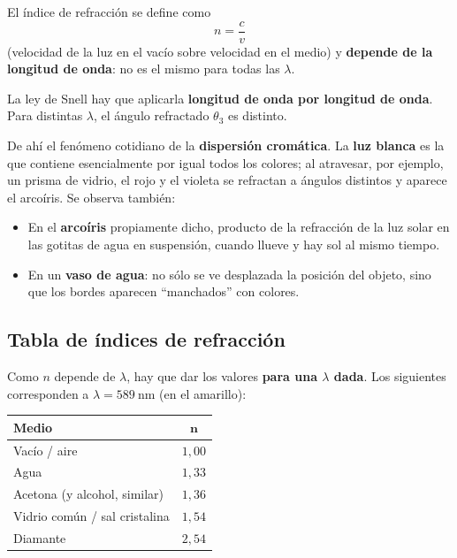 \documentclass[12pt,a4paper]{article}
\begin{document}
El índice de refracción se define como
\[
n = \frac{c}{v}
\]
(velocidad de la luz en el vacío sobre velocidad en el medio) y \textbf{depende
de la longitud de onda}: no es el mismo para todas las $\lambda$.

\begin{warnbox}[Consecuencia]
La ley de Snell hay que aplicarla \textbf{longitud de onda por longitud de
onda}. Para distintas $\lambda$, el ángulo refractado $\theta_3$ es distinto.
\end{warnbox}

De ahí el fenómeno cotidiano de la \textbf{dispersión cromática}. La \textbf{luz
blanca} es la que contiene esencialmente por igual todos los colores; al
atravesar, por ejemplo, un prisma de vidrio, el rojo y el violeta se refractan a
ángulos distintos y aparece el arcoíris. Se observa también:

\begin{itemize}
  \item En el \textbf{arcoíris} propiamente dicho, producto de la refracción de
        la luz solar en las gotitas de agua en suspensión, cuando llueve y hay
        sol al mismo tiempo.
  \item En un \textbf{vaso de agua}: no sólo se ve desplazada la posición del
        objeto, sino que los bordes aparecen \enquote{manchados} con colores.
\end{itemize}

\subsection{Tabla de índices de refracción}

Como $n$ depende de $\lambda$, hay que dar los valores \textbf{para una $\lambda$
dada}. Los siguientes corresponden a $\lambda = \SI{589}{\nano\metre}$ (en el
amarillo):

\begin{table}[H]
\centering
\begin{tabular}{lc}
\toprule
\textbf{Medio} & $\mathbf{n}$ \\
\midrule
Vacío / aire                  & $1{,}00$ \\
Agua                          & $1{,}33$ \\
Acetona (y alcohol, similar)  & $1{,}36$ \\
Vidrio común / sal cristalina & $1{,}54$ \\
Diamante                      & $2{,}54$ \\
\bottomrule
\end{tabular}
\end{table}
\end{document}
